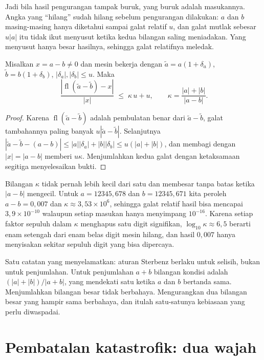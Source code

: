 Jadi bila hasil pengurangan tampak buruk, yang buruk adalah masukannya. Angka yang
``hilang'' sudah hilang sebelum pengurangan dilakukan: $a$ dan $b$ masing-masing hanya
diketahui sampai galat relatif $u$, dan galat mutlak sebesar $u|a|$ itu tidak ikut
menyusut ketika kedua bilangan saling meniadakan. Yang menyusut hanya besar hasilnya,
sehingga galat relatifnya meledak.

\begin{proposisi}
Misalkan $x=a-b\neq0$ dan mesin bekerja dengan $\tilde{a}=a(1+\delta_{a})$,
$\tilde{b}=b(1+\delta_{b})$, $|\delta_{a}|,|\delta_{b}|\le u$. Maka
\[
  \frac{|\operatorname{fl}(\tilde{a}-\tilde{b})-x|}{|x|}
  \;\le\;\kappa\,u+u,
  \qquad \kappa=\frac{|a|+|b|}{|a-b|}.
\]
\end{proposisi}

\begin{proof}
Karena $\operatorname{fl}(\tilde{a}-\tilde{b})$ adalah pembulatan benar dari
$\tilde{a}-\tilde{b}$, galat tambahannya paling banyak $u|\tilde{a}-\tilde{b}|$.
Selanjutnya
$|\tilde{a}-\tilde{b}-(a-b)|\le|a||\delta_{a}|+|b||\delta_{b}|\le u(|a|+|b|)$,
dan membagi dengan $|x|=|a-b|$ memberi $u\kappa$. Menjumlahkan kedua galat dengan
ketaksamaan segitiga menyelesaikan bukti.
\end{proof}

Bilangan $\kappa$ tidak pernah lebih kecil dari satu dan membesar tanpa batas ketika
$|a-b|$ mengecil. Untuk $a=12345{,}678$ dan $b=12345{,}671$ kita peroleh $a-b=0{,}007$
dan $\kappa\approx3{,}53\times10^{6}$, sehingga galat relatif hasil bisa mencapai
$3{,}9\times10^{-10}$ walaupun setiap masukan hanya menyimpang $10^{-16}$. Karena setiap
faktor sepuluh dalam $\kappa$ menghapus satu digit signifikan,
$\log_{10}\kappa\approx6{,}5$ berarti enam setengah dari enam belas digit mesin hilang,
dan hasil $0{,}007$ hanya menyisakan sekitar sepuluh digit yang bisa dipercaya.

Satu catatan yang menyelamatkan: aturan Sterbenz berlaku untuk selisih, bukan untuk
penjumlahan. Untuk penjumlahan $a+b$ bilangan kondisi adalah
$(|a|+|b|)/|a+b|$, yang mendekati satu ketika $a$ dan $b$ bertanda sama. Menjumlahkan
bilangan besar tidak berbahaya. Mengurangkan dua bilangan besar yang hampir sama
berbahaya, dan itulah satu-satunya kebiasaan yang perlu diwaspadai.

\section{Pembatalan katastrofik: dua wajah}

